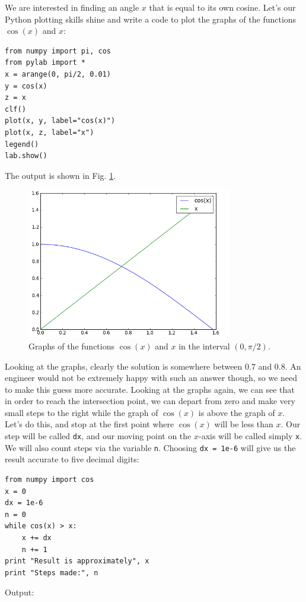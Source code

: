 We are interested in finding an angle $x$ that is equal
to its own cosine. Let's our Python plotting skills shine and write a code to plot the graphs of
the functions $\cos(x)$ and $x$:

\begin{verbatim}
from numpy import pi, cos
from pylab import *
x = arange(0, pi/2, 0.01)
y = cos(x)
z = x
clf()
plot(x, y, label="cos(x)")
plot(x, z, label="x")
legend()
lab.show()
\end{verbatim}
The output is shown in Fig. \ref{fig:xcosx}.

\begin{figure}[!ht]
\begin{center}
\includegraphics[width=0.8\textwidth]{imgp/xcosx.png}
\end{center}
\vspace{-2mm}
\caption{Graphs of the functions $\cos(x)$ and $x$ in the interval $(0, \pi/2)$.}
\label{fig:xcosx}
\end{figure}
\noindent
Looking at the graphs, clearly the solution is somewhere 
between $0.7$ and $0.8$. 
An engineer would not be extremely happy with such an answer though, 
so we need to make this guess more accurate. Looking at the graphs again, we can see
that in order to reach the intersection point, we can depart from zero and make very 
small steps to the right while the graph of $\cos(x)$ is above the graph of $x$.
Let's do this, and stop 
at the first point where $\cos(x)$ will be less than $x$. Our step will be called {\tt dx},
and our moving point on the $x$-axis will be called simply {\tt x}. We will also count 
steps via the variable {\tt n}. Choosing {\tt dx = 1e-6} will give us the result accurate 
to five decimal digits:

\begin{verbatim}
from numpy import cos
x = 0
dx = 1e-6
n = 0
while cos(x) > x:
    x += dx
    n += 1
print "Result is approximately", x
print "Steps made:", n
\end{verbatim}
Output:

